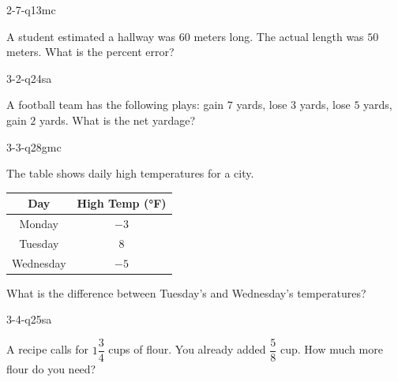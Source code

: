 \begin{practiceQuestion}{2-7-q13}{mc}
\begin{questionText}
A student estimated a hallway was $60$ meters long. The actual length was $50$ meters. What is the percent error?
\end{questionText}
\end{practiceQuestion}

\begin{practiceQuestion}{3-2-q24}{sa}
\begin{questionText}
A football team has the following plays: gain $7$ yards, lose $3$ yards, lose $5$ yards, gain $2$ yards. What is the net yardage?
\end{questionText}
\end{practiceQuestion}

\begin{practiceQuestion}{3-3-q28}{gmc}
\begin{questionText}
The table shows daily high temperatures for a city.

\begin{center}
\begin{tabular}{|c|c|}
\hline
\textbf{Day} & \textbf{High Temp (°F)} \\
\hline
Monday & $-3$ \\
\hline
Tuesday & $8$ \\
\hline
Wednesday & $-5$ \\
\hline
\end{tabular}
\end{center}

What is the difference between Tuesday's and Wednesday's temperatures?
\end{questionText}
\end{practiceQuestion}

\begin{practiceQuestion}{3-4-q25}{sa}
\begin{questionText}
A recipe calls for $1\dfrac{3}{4}$ cups of flour. You already added $\dfrac{5}{8}$ cup. How much more flour do you need?
\end{questionText}
\end{practiceQuestion}

